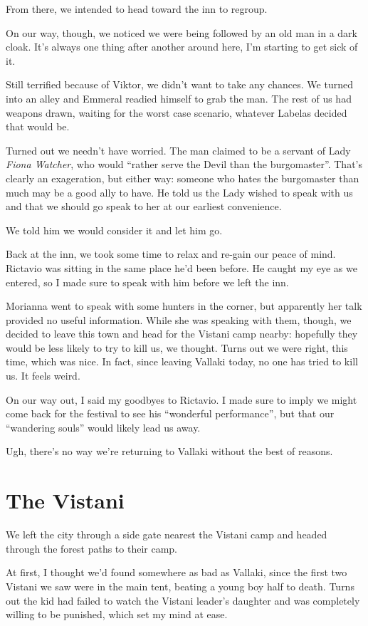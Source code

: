 From there, we intended to head toward the inn to regroup.

On our way, though, we noticed we were being followed by an old man in a dark cloak. It's always one thing after another around here, I'm starting to get sick of it.

Still terrified because of Viktor, we didn't want to take any chances. We turned into an alley and Emmeral readied himself to grab the man. The rest of us had weapons drawn, waiting for the worst case scenario, whatever Labelas decided that would be.

Turned out we needn't have worried. The man claimed to be a servant of Lady \emph{Fiona Watcher}, who would ``rather serve the Devil than the burgomaster''. That's clearly an exageration, but either way: someone who hates the burgomaster than much may be a good ally to have. He told us the Lady wished to speak with us and that   we should go speak to her at our earliest convenience.

We told him we would consider it and let him go.

Back at the inn, we took some time to relax and re-gain our peace of mind. Rictavio was sitting in the same place he'd been before. He caught my eye as we entered, so I made sure to speak with him before we left the inn.

Morianna went to speak with some hunters in the corner, but apparently her talk provided no useful information. While she was speaking with them, though, we decided to leave this town and head for the Vistani camp nearby: hopefully they would be less likely to try to kill us, we thought. Turns out we were right, this time, which was nice. In fact, since leaving Vallaki today, no one has tried to kill us. It feels weird.

On our way out, I said my goodbyes to Rictavio. I made sure to imply we might come back for the festival to see his ``wonderful performance'', but that our ``wandering souls'' would likely lead us away.

Ugh, there's no way we're returning to Vallaki without the best of reasons.

\section*{The Vistani}
We left the city through a side gate nearest the Vistani camp and headed through the forest paths to their camp.

At first, I thought we'd found somewhere as bad as Vallaki, since the first two Vistani we saw were in the main tent, beating a young boy half to death. Turns out the kid had failed to watch the Vistani leader's daughter and was completely willing to be punished, which set my mind at ease.

